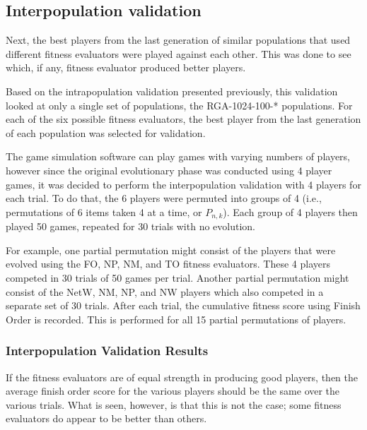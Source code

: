 \subsection{Interpopulation validation} \label{6_interPopValidation}

Next, the best players from the last generation of similar populations that used
different fitness evaluators were played against each other. This was done to
see which, if any, fitness evaluator produced better players. 

Based on the intrapopulation validation presented previously, this validation
looked at only a single set of populations, the RGA-1024-100-* populations. For
each of the six possible fitness evaluators, the best player from the last
generation of each population was selected for validation. 

The game simulation software can play games with varying numbers of players,
however since the original evolutionary phase was conducted using 4 player
games, it was decided to perform the interpopulation validation with 4 players
for each trial. To do that, the 6 players were permuted into groups of 4 (i.e.,
permutations of 6 items taken 4 at a time, or \(P_{n,k}\)). Each group of 4
players then played 50 games, repeated for 30 trials with no evolution.

For example, one partial permutation might consist of the players that were
evolved using the FO, NP, NM, and TO fitness evaluators. These 4 players
competed in 30 trials of 50 games per trial. Another partial permutation might
consist of the NetW, NM, NP, and NW players which also competed in a separate
set of 30 trials. After each trial, the cumulative fitness score using
Finish Order is recorded. This is performed for all 15 partial permutations of
players.

\subsubsection{Interpopulation Validation Results}

If the fitness evaluators are of equal strength in producing good players, then
the average finish order score for the various players should be the same over
the various trials. What is seen, however, is that this is not the case; some
fitness evaluators do appear to be better than others.

